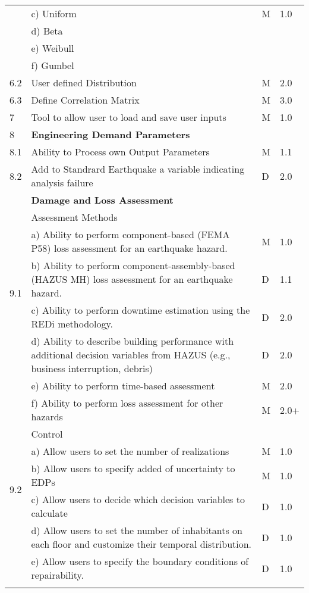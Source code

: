 {\begin{longtable}{| p{} | p{} | p{} | p{} |}
	 & c)     Uniform & M  & 1.0 \\ 
	 & d)     Beta &  &  \\ 
	 & e)     Weibull &  &  \\ 
	 & f)     Gumbel &  &  \\ \hline
	6.2 & User defined Distribution & M & 2.0 \\ \hline
	6.3 & Define Correlation Matrix & M & 3.0 \\ \hline
	7 & Tool to allow user to load and save user inputs & M & 1.0 \\ \hline
	8 & \textbf{Engineering Demand Parameters} &  &  \\ \hline
	8.1 & Ability to Process own Output Parameters & M & 1.1  \\ \hline
	8.2 & Add to Standrard Earthquake a variable indicating analysis failure & D & 2.0  \\ \hline
\softwareSwitch{PBE}{9 & \textbf{Damage and Loss Assessment} & & \\ \hline
    \multirow{5}{*}{9.1} & Assessment Methods & & \\
     & a) Ability to perform component-based (FEMA P58) loss assessment for an earthquake hazard. & M & 1.0 \\
     & b) Ability to perform component-assembly-based (HAZUS MH) loss assessment for an earthquake hazard. & D & 1.1 \\
     & c) Ability to perform downtime estimation using the REDi methodology. & D & 2.0 \\
     & d) Ability to describe building performance with additional decision variables from HAZUS (e.g., business interruption, debris) & D & 2.0 \\
     & e) Ability to perform time-based assessment & M & 2.0 \\
     & f) Ability to perform loss assessment for other hazards & M & 2.0+ \\ \hline
    \multirow{5}{*}{9.2} & Control & & \\
     & a) Allow users to set the number of realizations & M & 1.0\\
     & b) Allow users to specify added of uncertainty to EDPs & M & 1.0 \\
     & c) Allow users to decide which decision variables to calculate & D & 1.0 \\
     & d) Allow users to set the number of inhabitants on each floor and customize their temporal distribution. & D & 1.0 \\
     & e) Allow users to specify the boundary conditions of repairability. & D & 1.0 \\
}
\end{longtable}}
